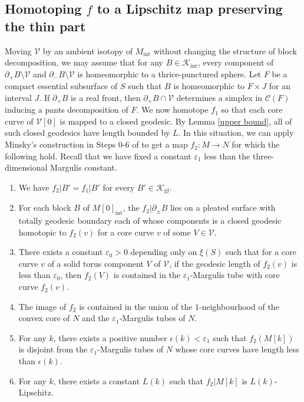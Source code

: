 \documentclass{amsart}
\theoremstyle{definition}
\numberwithin{figure}{section}
\numberwithin{equation}{section}
\def\ck{\mathcal{K}}
\def\cv{\mathcal{V}}
\def\part{\partial}
\begin{document}
\subsection{Homotoping $f$ to a Lipschitz map preserving the thin part}
Moving $\cv$  by an ambient isotopy of $M_{\mathrm{int}}$ without changing the structure of block decomposition, we may assume that  for any $B\in \ck_{\mathrm{int}}$, every component of  $\part_+ B\setminus \cv$ and $\part_- B\setminus \cv$ is homeomorphic to a thrice-punctured sphere.
Let $F$ be a compact essential subsurface of $S$ such that $B$ is homeomorphic to $F \times J$ for an interval $J$.
If $\partial_+ B$ is a real front, then $\partial_+ B \cap \cv$ determines a simplex  in $\mathcal C(F)$ inducing a pants decomposition of $F$.
We now homotope $f_1$ so that each core curve of $\cv[0]$ is mapped to a closed geodesic.
By Lemma \ref{upper bound}, all of such closed geodesics have length bounded by $L$.
In this situation, we can apply Minsky's construction in Steps 0-6 of \cite[Section 10]{mi2} to get a map $f_2: M\rightarrow N$ for which the following hold.
Recall that we have fixed a constant $\varepsilon_1$ less than the three-dimensional Margulis constant.
\begin{enumerate}
\label{conditions}
\item
We have $f_2|B'=f_1|B'$ for every $B' \in \mathcal{K}_\mathrm{gf}$.
\item
For each block $B$ of $M[0]_\mathrm{int}$, the $f_2| \partial_\pm B$  lies on a pleated surface with totally geodesic boundary each of whose components is a closed geodesic homotopic to $f_2(v)$ for a core curve $v$ of some $V \in \cv$.
\item
There exists a constant $\varepsilon_0>0$ depending only on $\xi(S)$ such that  for a core curve $v$ of a solid torus component $V$ of $\cv$, if the geodesic length of $f_2(v)$ is less than $\varepsilon_0$, then $f_2(V)$ is contained in the $\varepsilon_1$-Margulis tube with core curve $f_2(v)$.
\item
The image of $f_2$ is contained in the union of the $1$-neighbourhood of the convex core of $N$ and the $\varepsilon_1$-Margulis tubes of $N$.
\item
For any $k$, there exists a positive number $\epsilon(k) < \varepsilon_1$ such that $f_2(M[k])$ is disjoint from the $\varepsilon_1$-Margulis tubes of $N$ whose core curves have length less than $\epsilon(k)$.
\item For any $k$, there exists a constant $L(k)$ such that $f_2|M[k]$ is $L(k)$-Lipschitz.
\end{enumerate}
\end{document}
